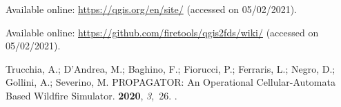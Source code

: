 \documentclass[atmosphere,article,accept,moreauthors,pdftex]{Definitions/mdpi}
\begin{document}
\begin{thebibliography}{999}
 {Available online: \url{https://qgis.org/en/site/} (accessed on 05/02/2021).} %

 {Available online: \url{https://github.com/firetools/qgis2fds/wiki/} (accessed on 05/02/2021).}

Trucchia, A.; D’Andrea, M.; Baghino, F.; Fiorucci, P.; Ferraris, L.; Negro,
  D.; Gollini, A.; Severino, M.
\newblock PROPAGATOR: An Operational Cellular-Automata Based Wildfire
  Simulator.
 {\bf 2020}, {\em 3},~26.
.

\end{thebibliography}








\end{document}
